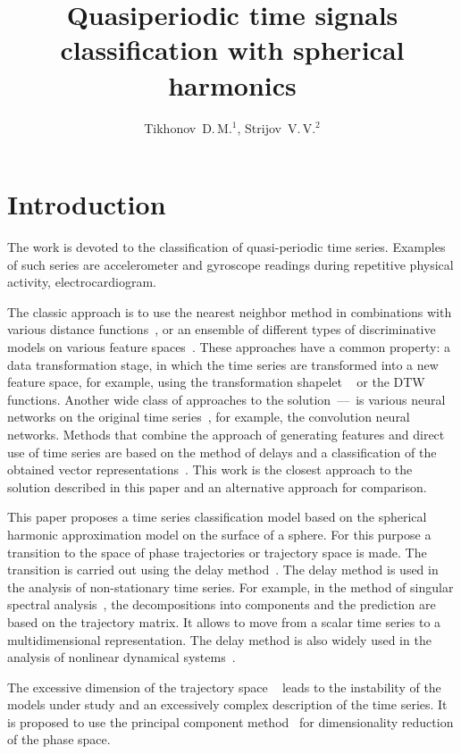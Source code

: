 \documentclass[12pt,twoside]{article}
\title
    [Quasiperiodic time signals classification] 
    {Quasiperiodic time signals classification with spherical harmonics}
\author
    {Tikhonov~D.\,M.$^1$, Strijov~V.\,V.$^2$} %
\begin{document}
\maketitle

\section{Introduction}
The work is devoted to the classification of quasi-periodic time series.
Examples of such series are accelerometer and gyroscope readings during repetitive physical activity, electrocardiogram.

The classic approach is to use the nearest neighbor method in  combinations with various distance functions~\cite{Bagnall_2017}, or an ensemble of different types of discriminative models on various feature spaces~\cite{Hills_2014, Bostrom2017, Kate_2015}.
These approaches have a common property: a data transformation stage, in which the time series are transformed into a new feature space, for example, using the transformation shapelet ~\cite{ Hills_2014, Bostrom2017} or the DTW~\cite{Kate_2015} functions.
Another wide class of approaches to the solution~---~is various neural networks on the original time series~\cite{WANG_2019}, for example, the convolution neural networks.
Methods that combine the approach of generating features and direct use of time series are based on the method of delays and a classification of the obtained vector representations~\cite{Frank_2010}.
This work is the closest approach to the solution described in this paper and an alternative approach for comparison.

This paper proposes a time series classification model based on the spherical harmonic approximation model on the surface of a sphere.
For this purpose a transition to the space of phase trajectories or trajectory space is made.
The transition is carried out using the delay method~\cite{LAI19961}.
The delay method is used in the analysis of non-stationary time series.
For example, in the method of singular spectral analysis~\cite{Golyandina2002}, the decompositions into components and the prediction are based on the trajectory matrix.
It allows to move from a scalar time series to a multidimensional representation.
The delay method is also widely used in the analysis of nonlinear dynamical systems~\cite{Takens1981, LAI19961}.

The excessive dimension of the trajectory space ~\cite{Golyandina2002, Motrenko2015,Usmanova2020} leads to the instability of the models under study and an excessively complex description of the time series.
It is proposed to use the principal component method~\cite{Ezukwoke2019, Scholkopf1998} for dimensionality reduction of the phase space.
\end{document}
